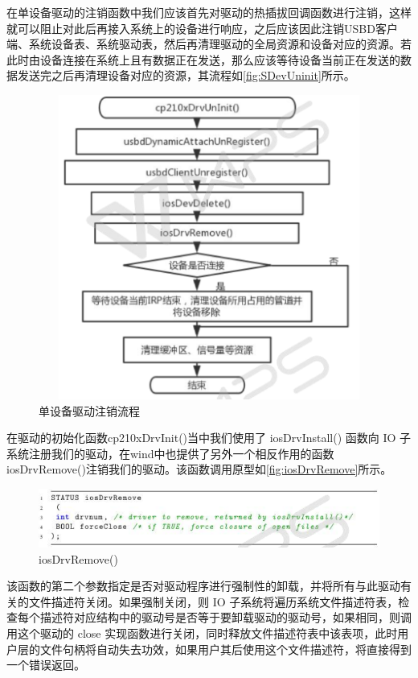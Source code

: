 	在单设备驱动的注销函数中我们应该首先对驱动的热插拔回调函数进行注销，这样就可以阻止对此后再接入系统上的设备进行响应，之后应该因此注销USBD客户端、系统设备表、系统驱动表，然后再清理驱动的全局资源和设备对应的资源。若此时由设备连接在系统上且有数据正在发送，那么应该等待设备当前正在发送的数据发送完之后再清理设备对应的资源，其流程如\autoref{fig:SDevUninit}所示。
\begin{figure}[!h]
\centering
\includegraphics[width=12cm ,height=10cm]{./graphics/SDevUninit.pdf}
\caption{单设备驱动注销流程}\label{fig:SDevUninit}
\end{figure}
	

	在驱动的初始化函数cp210xDrvInit()当中我们使用了 iosDrvInstall() 函数向 IO 子系统注册我们的驱动，在wind中也提供了另外一个相反作用的函数iosDrvRemove()注销我们的驱动。该函数调用原型如\autoref{fig:iosDrvRemove}所示。
	
\begin{figure}[!h]
\centering
\includegraphics[width=1.0\textwidth]{./graphics/iosDrvRemove.pdf}
\caption{iosDrvRemove()}\label{fig:iosDrvRemove}
\end{figure}

该函数的第二个参数指定是否对驱动程序进行强制性的卸载，并将所有与此驱动有关的文件描述符关闭。如果强制关闭，则 IO 子系统将遍历系统文件描述符表，检查每个描述符对应结构中的驱动号是否等于要卸载驱动的驱动号，如果相同，则调用这个驱动的 close 实现函数进行关闭，同时释放文件描述符表中该表项，此时用户层的文件句柄将自动失去功效，如果用户其后使用这个文件描述符，将直接得到一个错误返回。




